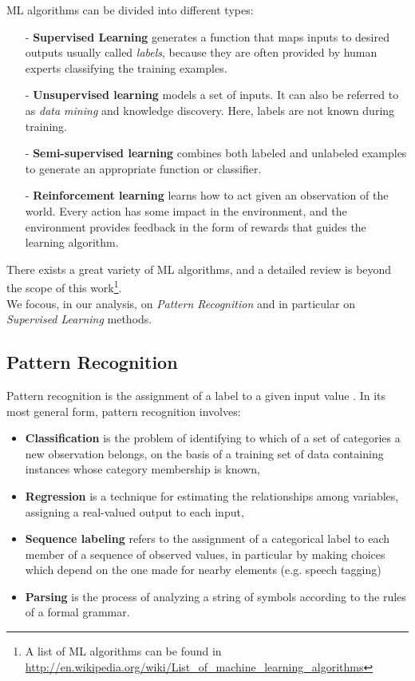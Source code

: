 \Gls{ML} algorithms can be divided into different types:
\begin{itemize} 
 \item [-] \textbf{Supervised Learning} generates a function that maps inputs to desired outputs usually called \textit{labels},
	because they are often provided by human experts classifying the training examples.
 \item [-] \textbf{Unsupervised learning} models a set of inputs. It can also be referred to as \textit{data mining} and knowledge discovery. Here, labels are not known during training.
 \item [-] \textbf{Semi-supervised learning} combines both labeled and unlabeled examples to generate an appropriate function or classifier. 
 \item [-] \textbf{Reinforcement learning} learns how to act given an observation of the world. Every action has some impact in the environment, and the environment provides feedback in the form of rewards that guides the learning algorithm.
\end{itemize}

There exists a great variety of \Gls{ML} algorithms, and a detailed review is beyond the scope of this work\footnote{A list of \Gls{ML} algorithms can be found in
\url{http://en.wikipedia.org/wiki/List_of_machine_learning_algorithms}}.\\
We focous, in our analysis, on \textit{Pattern Recognition} and in particular on \textit{Supervised Learning} methods.

\subsection{Pattern Recognition}

Pattern recognition is the assignment of a label to a given input value \cite{bishop2006pattern, theodoridis2008pattern}. In its most general form, pattern recognition involves:

\begin{itemize}
 \item \textbf{Classification} is the problem of identifying to which of a set of categories a new observation belongs, on the basis
 of a training set of data containing instances whose category membership is known,
 \item \textbf{Regression} is a technique for estimating the relationships among variables, assigning a real-valued output to each input,
 \item \textbf{Sequence labeling} refers to the assignment of a categorical label to each member of a sequence of observed values,
 in particular by making choices which depend on the one made for nearby elements (e.g. speech tagging)
 \item \textbf{Parsing} is the process of analyzing a string of symbols according to the rules of a formal grammar.
\end{itemize}

